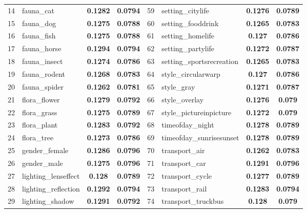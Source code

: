 \begin{table}[ht!]
\begin{scriptsize}
\begin{tabular}{|c|lcc||c|lcc|}
14&fauna\_cat&		\textbf{0.1282}&\textbf{0.0794}&	59&setting\_citylife&	\textbf{0.1276}&	\textbf{0.0789}\\         
15&fauna\_dog&		\textbf{0.1275}&\textbf{0.0788}&	60&setting\_fooddrink&  \textbf{0.1265}&	\textbf{0.0783}\\         
16&fauna\_fish&		\textbf{0.1275}&\textbf{0.0788}&	61&setting\_homelife&   \textbf{0.127}&		\textbf{0.0786}\\         
17&fauna\_horse&	\textbf{0.1294}&\textbf{0.0794}&	62&setting\_partylife&	\textbf{0.1272}&	\textbf{0.0787}\\         
18&fauna\_insect&	\textbf{0.1274}&\textbf{0.0786}&	63&setting\_sportsrecreation&\textbf{0.1265}&	\textbf{0.0783}\\         
19&fauna\_rodent&  	\textbf{0.1268}&\textbf{0.0783}&	64&style\_circularwarp&	\textbf{0.127}&		\textbf{0.0786}\\         
20&fauna\_spider&  	\textbf{0.1262}&\textbf{0.0781}&        65&style\_gray&		\textbf{0.1271}&	\textbf{0.0787}\\         
21&flora\_flower&  	\textbf{0.1279}&\textbf{0.0792}&        66&style\_overlay&	\textbf{0.1276}&	\textbf{0.079} \\         
22&flora\_grass& 	\textbf{0.1275}&\textbf{0.0789}&        67&style\_pictureinpicture&\textbf{0.1272}&     \textbf{0.079} \\         
23&flora\_plant&  	\textbf{0.1283}&\textbf{0.0792}&        68&timeofday\_night&  	\textbf{0.1278}&	\textbf{0.0789}\\         
24&flora\_tree&  	\textbf{0.1273}&\textbf{0.0786}&         69&timeofday\_sunrisesunset&\textbf{0.1278}&    \textbf{0.0789}\\         
25&gender\_female&  	\textbf{0.1286}&\textbf{0.0796}&        70&transport\_air&	\textbf{0.1262}&	\textbf{0.0783}\\         
26&gender\_male&  	\textbf{0.1275}&\textbf{0.0796}&        71&transport\_car&   	\textbf{0.1291}&	\textbf{0.0796}\\         
27&lighting\_lenseffect&\textbf{0.128}&\textbf{0.0789}&		72&transport\_cycle&	\textbf{0.1277}&	\textbf{0.0789}\\         
28&lighting\_reflection&\textbf{0.1292}&\textbf{0.0794}&        73&transport\_rail&	\textbf{0.1283}&	\textbf{0.0794}\\         
29&lighting\_shadow&  	\textbf{0.1291}&\textbf{0.0792}&        74&transport\_truckbus& \textbf{0.128}&    	\textbf{0.079}\\         

\end{tabular}
\end{scriptsize}
\end{table}
